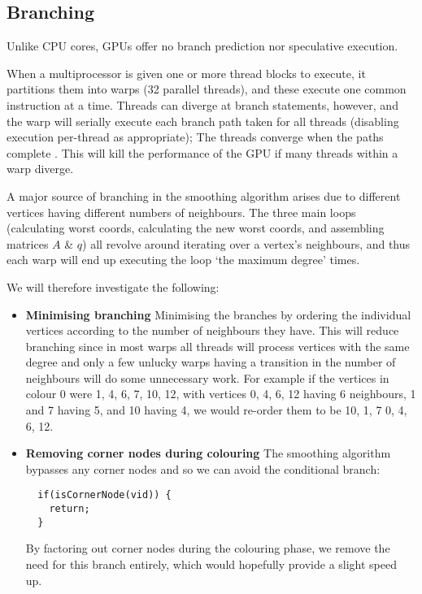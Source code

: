 \subsection{Branching}
Unlike CPU cores, GPUs offer no branch prediction nor speculative execution.

When a multiprocessor is given one or more thread blocks to execute, it partitions them into warps (32 parallel threads), and these execute one common instruction at a time.
Threads can diverge at branch statements, however, and the warp will serially execute each branch path taken for all threads (disabling execution per-thread as appropriate); The threads converge when the paths complete \cite{cuda_guide}. This will kill the performance of the GPU if many threads within a warp diverge.

A major source of branching in the smoothing algorithm arises due to different vertices having different numbers of neighbours. The three main loops (calculating worst coords, calculating the new worst coords, and assembling matrices $A$ \& $q$) all revolve around iterating over a vertex's neighbours, and thus each warp will end up executing the loop `the maximum degree' times.

We will therefore investigate the following:
\begin{itemize}
  \item \textbf{Minimising branching}
                Minimising the branches by ordering the individual vertices according to the number of neighbours they have. This will reduce branching since in most warps all threads will process vertices with the same degree and only a few unlucky warps having a transition in the number of neighbours will do some unnecessary work.
                For example if the vertices in colour 0 were 1, 4, 6, 7, 10, 12, with vertices 0, 4, 6, 12 having 6 neighbours, 1 and 7 having 5, and 10 having 4, we would re-order them to be 10, 1, 7 0, 4, 6, 12.

  \item \textbf{Removing corner nodes during colouring}
                The smoothing algorithm bypasses any corner nodes and so we can avoid the conditional branch:
                \begin{verbatim}
  if(isCornerNode(vid)) {
    return;
  }
                \end{verbatim}
                By factoring out corner nodes during the colouring phase, we remove the need for this branch entirely, which would hopefully provide a slight speed up.
\end{itemize}
